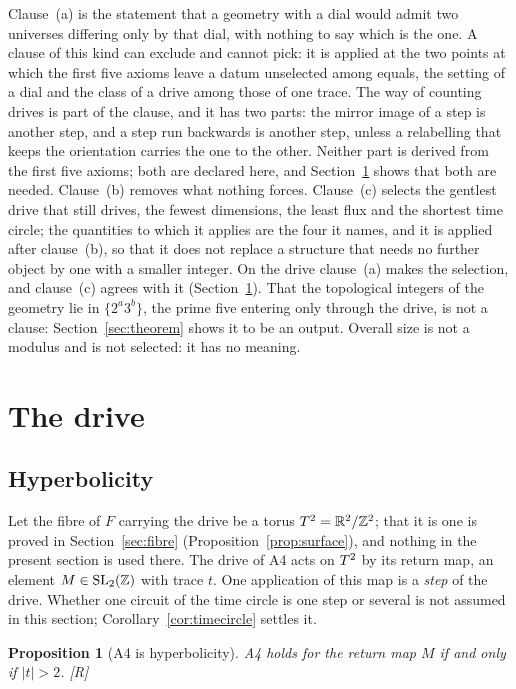 \documentclass[11pt,a4paper]{article}
\theoremstyle{plain}
\newtheorem{proposition}[theorem]{Proposition}
\theoremstyle{definition}
\theoremstyle{remark}
\newcommand{\rigR}{[\textup{R}]}
\begin{document}
Clause~(a) is the statement that a geometry with a dial would admit two universes differing only by that dial, with nothing to say which is the one. A clause of this kind can exclude and cannot pick: it is applied at the two points at which the first five axioms leave a datum unselected among equals, the setting of a dial and the class of a drive among those of one trace. The way of counting drives is part of the clause, and it has two parts: the mirror image of a step is another step, and a step run backwards is another step, unless a relabelling that keeps the orientation carries the one to the other. Neither part is derived from the first five axioms; both are declared here, and Section~\ref{sec:drive} shows that both are needed. Clause~(b) removes what nothing forces. Clause~(c) selects the gentlest drive that still drives, the fewest dimensions, the least flux and the shortest time circle; the quantities to which it applies are the four it names, and it is applied after clause~(b), so that it does not replace a structure that needs no further object by one with a smaller integer. On the drive clause~(a) makes the selection, and clause~(c) agrees with it (Section~\ref{sec:drive}). That the topological integers of the geometry lie in $\{2^{a}3^{b}\}$, the prime five entering only through the drive, is not a clause: Section~\ref{sec:theorem} shows it to be an output. Overall size is not a modulus and is not selected: it has no meaning.

\section{The drive}\label{sec:drive}

\subsection{Hyperbolicity}

Let the fibre of $F$ carrying the drive be a torus $T^2=\mathbb{R}^{2}/\mathbb{Z}^{2}$; that it is one is proved in Section~\ref{sec:fibre} (Proposition~\ref{prop:surface}), and nothing in the present section is used there. The drive of A4 acts on $T^2$ by its return map, an element $M\in\mathrm{SL}_{2}(\mathbb{Z})$ with trace $t$. One application of this map is a \emph{step} of the drive. Whether one circuit of the time circle is one step or several is not assumed in this section; Corollary~\ref{cor:timecircle} settles it.

\begin{proposition}[A4 is hyperbolicity]\label{prop:hyp}
A4 holds for the return map $M$ if and only if $\lvert t\rvert>2$. \rigR
\end{proposition}
\end{document}
